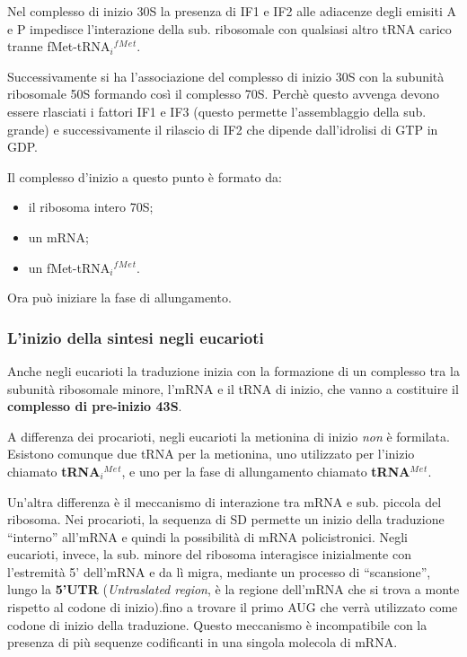 \documentclass[]{article}
\begin{document}
Nel complesso di inizio 30S la presenza di IF1 e IF2 alle adiacenze
degli emisiti A e P impedisce l'interazione della sub. ribosomale con
qualsiasi altro tRNA carico tranne
fMet-tRNA\(_i\)\(^f\)\(^M\)\(^e\)\(^t\).

Successivamente si ha l'associazione del complesso di inizio 30S con la
subunità ribosomale 50S formando così il complesso 70S. Perchè questo
avvenga devono essere rlasciati i fattori IF1 e IF3 (questo permette
l'assemblaggio della sub. grande) e successivamente il rilascio di IF2
che dipende dall'idrolisi di GTP in GDP.

Il complesso d'inizio a questo punto è formato da:

\begin{itemize}
\itemsep1pt\parskip0pt
\item
  il ribosoma intero 70S;
\item
  un mRNA;
\item
  un fMet-tRNA\(_i\)\(^f\)\(^M\)\(^e\)\(^t\).
\end{itemize}

Ora può iniziare la fase di allungamento.

\subsubsection{L'inizio della sintesi negli
eucarioti}\label{linizio-della-sintesi-negli-eucarioti}

Anche negli eucarioti la traduzione inizia con la formazione di un
complesso tra la subunità ribosomale minore, l'mRNA e il tRNA di inizio,
che vanno a costituire il \textbf{complesso di pre-inizio 43S}.

A differenza dei procarioti, negli eucarioti la metionina di inizio
\emph{non} è formilata. Esistono comunque due tRNA per la metionina, uno
utilizzato per l'inizio chiamato \textbf{tRNA\(_i\)\(^M\)\(^e\)\(^t\)},
e uno per la fase di allungamento chiamato
\textbf{tRNA\(^M\)\(^e\)\(^t\)}.

Un'altra differenza è il meccanismo di interazione tra mRNA e sub.
piccola del ribosoma. Nei procarioti, la sequenza di SD permette un
inizio della traduzione ``interno'' all'mRNA e quindi la possibilità di
mRNA policistronici. Negli eucarioti, invece, la sub. minore del
ribosoma interagisce inizialmente con l'estremità 5' dell'mRNA e da lì
migra, mediante un processo di ``scansione'', lungo la \textbf{5'UTR}
(\emph{Untraslated region}, è la regione dell'mRNA che si trova a monte
rispetto al codone di inizio).fino a trovare il primo AUG che verrà
utilizzato come codone di inizio della traduzione. Questo meccanismo è
incompatibile con la presenza di più sequenze codificanti in una singola
molecola di mRNA.
\end{document}
